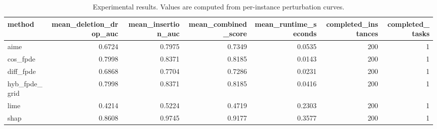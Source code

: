 \begin{table}[t]
\caption{Experimental results. Values are computed from per-instance perturbation curves.}
\label{tab:main_results_computed}
\centering
\begin{tabular}{lrrrrrr}
\toprule
method & mean\_deletion\_drop\_auc & mean\_insertion\_auc & mean\_combined\_score & mean\_runtime\_seconds & completed\_instances & completed\_tasks \\
\midrule
aime & 0.6724 & 0.7975 & 0.7349 & 0.0535 & 200 & 1 \\
cos\_fpde & 0.7998 & 0.8371 & 0.8185 & 0.0143 & 200 & 1 \\
diff\_fpde & 0.6868 & 0.7704 & 0.7286 & 0.0231 & 200 & 1 \\
hyb\_fpde\_grid & 0.7998 & 0.8371 & 0.8185 & 0.0416 & 200 & 1 \\
lime & 0.4214 & 0.5224 & 0.4719 & 0.2303 & 200 & 1 \\
shap & 0.8608 & 0.9745 & 0.9177 & 0.3577 & 200 & 1 \\
\bottomrule
\end{tabular}

\end{table}
